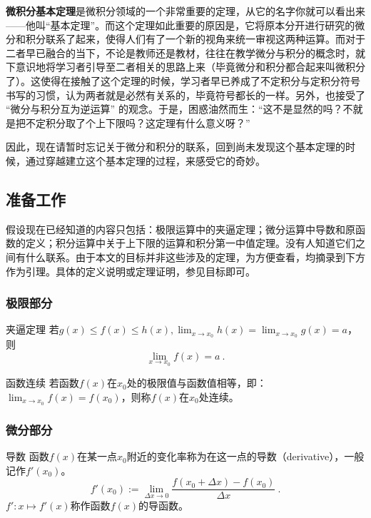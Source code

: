 
\begin{issues}
\issueNeedCite
\issueDraft
\end{issues}

\textbf{微积分基本定理}是微积分领域的一个非常重要的定理，从它的名字你就可以看出来——他叫“基本定理”。而这个定理如此重要的原因是，它将原本分开进行研究的微分和积分联系了起来，使得人们有了一个新的视角来统一审视这两种运算。而对于二者早已融合的当下，不论是教师还是教材，往往在教学微分与积分的概念时，就下意识地将学习者引导至二者相关的思路上来（毕竟微分和积分都合起来叫微积分了）。这使得在接触了这个定理的时候，学习者早已养成了不定积分与定积分符号书写的习惯，认为两者就是必然有关系的，毕竟符号都长的一样。另外，也接受了 “微分与积分互为逆运算” 的观念。于是，困惑油然而生：“这不是显然的吗？不就是把不定积分取了个上下限吗？这定理有什么意义呀？”

因此，现在请暂时忘记关于微分和积分的联系，回到尚未发现这个基本定理的时候，通过穿越建立这个基本定理的过程，来感受它的奇妙。

\subsection{准备工作}


假设现在已经知道的内容只包括：极限运算中的夹逼定理；微分运算中导数和原函数的定义；积分运算中关于上下限的运算和积分第一中值定理。没有人知道它们之间有什么联系。由于本文的目标并非这些涉及的定理，为方便查看，均摘录到下方作为引理。具体的定义说明或定理证明，参见目标即可。

\subsubsection{极限部分}
\begin{lemma}{夹逼定理}\label{lem_FTcalc_3}
若$g(x)\leq f(x)\leq h(x),\lim _{x\to x_0}h(x)=\lim _{x\to x_0}g(x)=a$，则
$$\lim _{x\to x_0}f(x)=a~.$$
\end{lemma}

\begin{definition}{函数连续}\label{def_FTcalc_1}
若函数$f(x)$在$x_0$处的极限值与函数值相等，即：$\lim_{x\to x_0}f(x)=f(x_0)$，则称$f(x)$在$x_0$处连续。
\end{definition}
\subsubsection{微分部分}
\begin{definition}{导数}\label{def_FTcalc_2}
函数$f(x)$在某一点$x_0$附近的变化率称为在这一点的导数（derivative），一般记作$f'(x_0)$。
$$f'(x_0):=\lim_{\Delta x\to0}{\frac{f(x_0+\Delta x)-f(x_0)}{\Delta x}}~.$$
$f':x\mapsto f'(x)$称作函数$f(x)$的导函数。
\end{definition}

